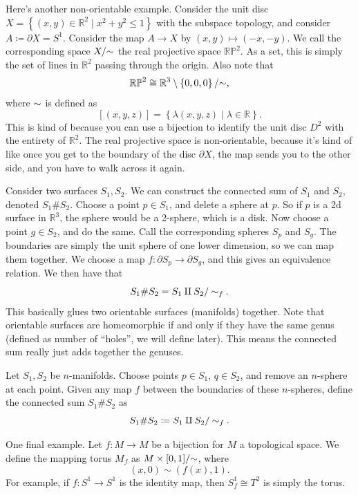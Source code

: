 Here's another non-orientable example. Consider the unit disc $X=\left\{ (x,y)\in\mathbb{R} ^2\mid x^2+y^2\leq 1 \right\} $ with the subspace topology, and consider $A\coloneqq \partial X=S^1$. Consider the map $A \to X$ by $(x,y)\mapsto (-x,-y)$. We call the corresponding space $X/\mathbin{\sim} $ the real projective space $\mathbb{RP}^2 $. As a set, this is simply the set of lines in $\mathbb{R} ^2$ passing through the origin. Also note that
\[
	\mathbb{RP}^2 \cong \mathbb{R}^3 \setminus \left\{ 0,0,0 \right\} /\mathbin{\sim} 
,\]
where $\mathbin{\sim} $ is defined as
\[
	[(x,y,z)]=\left\{ \lambda(x,y,z)\mid \lambda \in\mathbb{R}  \right\} 
.\]
This is kind of because you can use a bijection to identify the unit disc $D^2$ with the entirety of $\mathbb{R} ^2$. The real projective space is non-orientable, because it's kind of like once you get to the boundary of the disc $\partial X$, the map sends you to the other side, and you have to walk across it again.

Consider two surfaces $S_1,S_2$. We can construct the connected sum of $S_1$ and $S_2$, denoted $S_1\#S_2$. Choose a point $p\in S_1$, and delete a sphere at $p$. So if $p$ is a 2d surface in $\mathbb{R} ^3$, the sphere would be a 2-sphere, which is a disk. Now choose a point $g\in S_2$, and do the same. Call the corresponding spheres $S_p$ and $S_g$. The boundaries are simply the unit sphere of one lower dimension, so we can map them together. We choose a map $f : \partial S_p \to \partial S_g$, and this gives an equivalence relation. We then have that
\[
	S_1\#S_2=S_1\amalg S_2 /\mathbin{\sim}_f
.\]
This basically glues two orientable surfaces (manifolds) together. Note that orientable surfaces are homeomorphic if and only if they have the same genus (defined as number of ``holes'', we will define later). This means the connected sum really just adds together the genuses.
\begin{definition}\label{dfn:1.1.1}
	Let $S_1,S_2$ be $n$-manifolds. Choose points $p\in S_1$, $q\in S_2$, and remove an $n$-sphere at each point. Given any map $f$ between the boundaries of these $n$-spheres, define the connected sum $S_1\#S_2$ as
	\[
		S_1\#S_2\coloneqq S_1\amalg S_2 / \mathbin{\sim}_f
	.\]
\end{definition}

One final example. Let $f : M \to M$ be a bijection for $M$ a topological space. We define the mapping torus $M_f$ as $M\times [0,1]/\mathbin{\sim}$, where
\[
	(x,0)\sim (f(x),1)
.\]
For example, if $f : S^1 \to S^1$ is the identity map, then $S^1_f \cong T^2$ is simply the torus.
